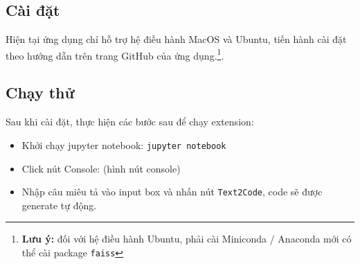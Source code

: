 \documentclass[12pt]{article}
\begin{document}
\subsection{Cài đặt}
Hiện tại ứng dụng chỉ hỗ trợ hệ điều hành MacOS và Ubuntu, tiến hành cài đặt theo hướng dẫn trên trang GitHub của ứng dụng.\footnote{\textbf{Lưu ý:} đối với hệ điều hành Ubuntu, phải cài Miniconda / Anaconda mới có thể cài package \texttt{faiss}}.

\subsection{Chạy thử}
Sau khi cài đặt, thực hiện các bước sau để chạy extension:
\begin{itemize}
\item Khởi chạy jupyter notebook: \texttt{jupyter notebook}
\item Click nút Console: (hình nút console)
\item Nhập câu miêu tả vào input box và nhấn nút \texttt{Text2Code}, code sẽ được generate tự động.
\end{itemize}
\end{document}
